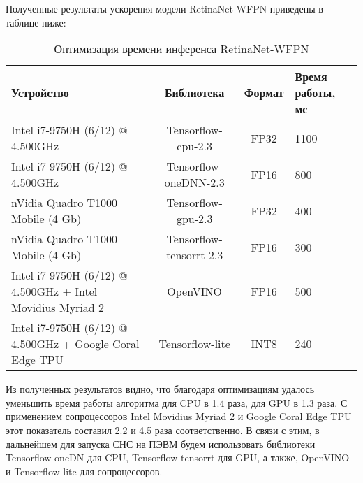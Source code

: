 Полученные результаты ускорения модели RetinaNet-WFPN приведены в таблице ниже:

\begin{table}[H]
    \caption{Оптимизация времени инференса RetinaNet-WFPN}\label{leaderboard-full}
    \begin{tabular}{|p{6cm}|c|c|p{2cm}|}
        \hline
        {Устройство} & {Библиотека} & {Формат} & {Время работы, мс} \\
        \hline
        Intel i7-9750H (6/12) @ 4.500GHz & Tensorflow-cpu-2.3 & FP32 & 1100 \\
        \hline
        Intel i7-9750H (6/12) @ 4.500GHz & Tensorflow-oneDNN-2.3 & FP16 & 800 \\
        \hline
        nVidia Quadro T1000 Mobile (4 Gb) & Tensorflow-gpu-2.3 & FP32 & 400 \\
        \hline
        nVidia Quadro T1000 Mobile (4 Gb) & Tensorflow-tensorrt-2.3 & FP16 & 300 \\
        \hline
        Intel i7-9750H (6/12) @ 4.500GHz + Intel Movidius Myriad 2 & OpenVINO & FP16 & 500 \\
        \hline
        Intel i7-9750H (6/12) @ 4.500GHz + Google Coral Edge TPU & Tensorflow-lite & INT8 & 240 \\
        \hline
    \end{tabular}
\end{table}

Из полученных результатов видно, что благодаря оптимизациям удалось уменьшить время работы алгоритма для CPU в 1.4 раза, для GPU в 1.3 раза. С применением сопроцессоров Intel Movidius Myriad 2 и Google Coral Edge TPU этот показатель составил 2.2 и 4.5 раза соответственно. В связи с этим, в дальнейшем для запуска СНС на ПЭВМ будем использовать библиотеки Tensorflow-oneDN для CPU, Tensorflow-tensorrt для GPU, а также, OpenVINO и Tensorflow-lite для сопроцессоров.

